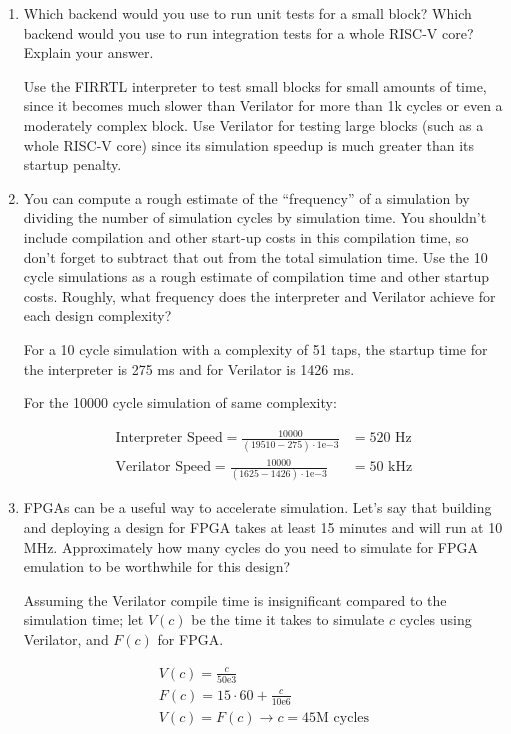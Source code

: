 \begin{enumerate}
\item {\color{blue} Which backend would you use to run unit tests for a small block? Which backend would you use to run integration tests for a whole RISC-V core? Explain your answer.}

Use the FIRRTL interpreter to test small blocks for small amounts of time, since it becomes much slower than Verilator for more than 1k cycles or even a moderately complex block. Use Verilator for testing large blocks (such as a whole RISC-V core) since its simulation speedup is much greater than its startup penalty.

\item {\color{blue} You can compute a rough estimate of the “frequency” of a simulation by dividing the number of simulation cycles by simulation time. You shouldn’t include compilation and other start-up costs in this compilation time, so don’t forget to subtract that out from the total simulation time. Use the 10 cycle simulations as a rough estimate of compilation time and other startup costs. Roughly, what frequency does the interpreter and Verilator achieve for each design complexity?}

For a 10 cycle simulation with a complexity of 51 taps, the startup time for the interpreter is 275 ms and for Verilator is 1426 ms.

For the 10000 cycle simulation of same complexity:

\begin{align}
    \text{Interpreter Speed} = \frac{10000}{(19510 - 275) \cdot 1\mathrm{e}{-3}} &= 520 \text{ Hz} \nonumber \\
    \text{Verilator Speed} = \frac{10000}{(1625 - 1426) \cdot 1\mathrm{e}{-3}} &= 50 \text{ kHz} \nonumber
\end{align}

\item {\color{blue} FPGAs can be a useful way to accelerate simulation. Let’s say that building and deploying a design for FPGA takes at least 15 minutes and will run at 10 MHz. Approximately how many cycles do you need to simulate for FPGA emulation to be worthwhile for this design?}

Assuming the Verilator compile time is insignificant compared to the simulation time; let $V(c)$ be the time it takes to simulate $c$ cycles using Verilator, and $F(c)$ for FPGA.

\begin{align}
    V(c) = \frac{c}{50\mathrm{e}{3}} \nonumber \\
    F(c) = 15 \cdot 60 + \frac{c}{10\mathrm{e}{6}} \nonumber \\
    V(c) = F(c) \rightarrow c = 45 \text{M cycles} \nonumber
\end{align}
\end{enumerate}

